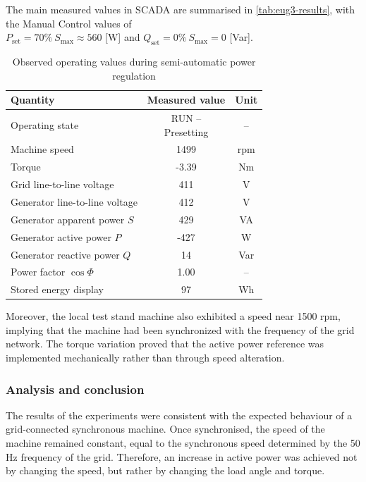 \documentclass{article}
\begin{document}
The main measured values in SCADA are summarised in \autoref{tab:eug3-results},
with the Manual Control values of\\
$P_\text{set} = 70\%\ S_\text{max} \approx 560$ [W] and $Q_\text{set} = 0\%\ S_\text{max} = 0$ [Var].

\begin{table}[H]
    \centering
    \caption{Observed operating values during semi-automatic power regulation}
    \label{tab:eug3-results}
    \begin{tabular}{lcc}
        \toprule
        \textbf{Quantity} & \textbf{Measured value} & \textbf{Unit}\\
        \midrule
        Operating state & \makecell{RUN --\\Presetting} & -- \\
        Machine speed & 1499 & rpm \\
        Torque & -3.39 & Nm \\
        Grid line-to-line voltage & 411 & V \\
        Generator line-to-line voltage & 412 & V \\
        Generator apparent power $S$ & 429 & VA \\
        Generator active power $P$ & -427 & W \\
        Generator reactive power $Q$ & 14 & Var \\
        Power factor $\cos\Phi$ & 1.00 & -- \\
        Stored energy display & 97 & Wh \\
        \bottomrule
    \end{tabular}
\end{table}

Moreover, the local test stand machine also exhibited a speed near 1500 rpm, implying
that the machine had been synchronized with the frequency of the grid network. The
torque variation proved that the active power reference was implemented mechanically
rather than through speed alteration.

\subsubsection{Analysis and conclusion}
The results of the experiments were consistent with the expected behaviour of a
grid-connected synchronous machine. Once synchronised, the speed of the machine remained
constant, equal to the synchronous speed determined by the 50 Hz frequency of the grid.
Therefore, an increase in active power was achieved not by changing the speed, but rather
by changing the load angle and torque.
\end{document}
